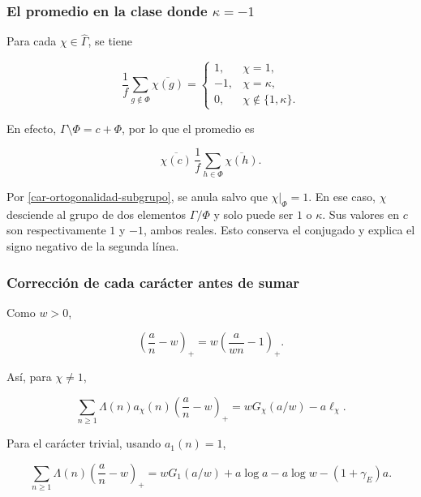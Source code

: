 \subsubsection*{El promedio en la clase donde $\kappa=-1$}

Para cada $\chi\in\widehat\Gamma$, se tiene

\begin{equation}
\frac1f\sum_{g\notin\Phi}\overline{\chi(g)}
=
\begin{cases}
1,&\chi=1,\\
-1,&\chi=\kappa,\\
0,&\chi\notin\{1,\kappa\}.
\end{cases}
\label{car-promedio-clase}
\end{equation}

En efecto, $\Gamma\setminus\Phi=c+\Phi$, por lo que el promedio es

\[
\overline{\chi(c)}\,
\frac1f\sum_{h\in\Phi}\overline{\chi(h)}.
\]

Por \eqref{car-ortogonalidad-subgrupo}, se anula salvo que $\chi|_\Phi=1$. En ese caso, $\chi$ desciende al grupo de dos elementos $\Gamma/\Phi$ y solo puede ser $1$ o $\kappa$. Sus valores en $c$ son respectivamente $1$ y $-1$, ambos reales. Esto conserva el conjugado y explica el signo negativo de la segunda línea.

\begin{minipage}{\linewidth}
\subsubsection*{Corrección de cada carácter antes de sumar}

Como $w>0$,

\[
\left(\frac an-w\right)_+
=w\left(\frac a{wn}-1\right)_+.
\]
\end{minipage}

Así, para $\chi\ne1$,

\begin{equation}
\sum_{n\ge1}\Lambda(n)a_\chi(n)
\left(\frac an-w\right)_+
=wG_\chi(a/w)-a\ell_\chi.
\label{car-correccion-no-principal}
\end{equation}

Para el carácter trivial, usando $a_1(n)=1$,

\begin{equation}
\sum_{n\ge1}\Lambda(n)
\left(\frac an-w\right)_+
=wG_1(a/w)+a\log a-a\log w-(1+\gamma_E)a.
\label{car-correccion-principal}
\end{equation}

